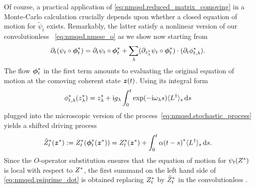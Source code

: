 Of course, a practical application of \autoref{eq:nmqsd.reduced_matrix_comoving} in a Monte-Carlo calculation crucially depends upon whether a closed equation of motion for $\tilde\psi_t$ exists.
Remarkably, the latter satisfy a nonlinear version of our convolutionless \NMSSE~\ref{eq:nmqsd.nmsse_o} \cite{DiGiSt98_nmqsd} as we show now starting from
\begin{equation}
  \partial_t (\psi_t \circ {\boldsymbol{\phi}}^*_t) = \partial_t\psi_t \circ {\boldsymbol{\phi}}^*_t + \sum_\lambda (\partial_{{z}^*_\lambda} \psi_t \circ {\boldsymbol{\phi}}^*_t) \cdot (\partial_t {\phi}^*_{t, \lambda}).
  \label{eq:nmqsd.psiprime_dot}
\end{equation}
The flow ${\boldsymbol{\phi}}^*_t$ in the first term amounts to evaluating the original equation of motion at the comoving coherent state $\boldsymbol{z}(t)$.
Using its integral form
\begin{equation}
  \ccphitla(\cc z_\lambda) = \cc z_\lambda + \ii g_\lambda \int_0^t \exp(-\ii \omega_\lambda s) \qmean{\adj L}_s \dd s
  \label{eq:nmqsd.comoving_flow}
\end{equation}
plugged into the microscopic version of the process~\ref{eq:nmqsd.stochastic_process} yields a shifted driving process
\begin{equation}
  {\tilde Z}^*_t({\boldsymbol{z}}^*) := {Z}^*_t({\boldsymbol{\phi}}^*_t({\boldsymbol{z}}^*)) = {Z}^*_t({\boldsymbol{z}}^*) + \int_0^t {\alpha(t-s)}^* \langle L^\dagger \rangle_s \, \mathrm{d} s.
  \label{eq:stochastic_process_shiften}
\end{equation}
Since the $O$-operator substitution ensures that the equation of motion for $\psi_t({Z}^*)$ is local with respect to ${Z}^*$, the first summand on the left hand side of \autoref{eq:nmqsd.psiprime_dot} is obtained replacing ${Z}^*_t$ by ${\tilde Z}^*_t$ in the convolutionless \NMSSE.

